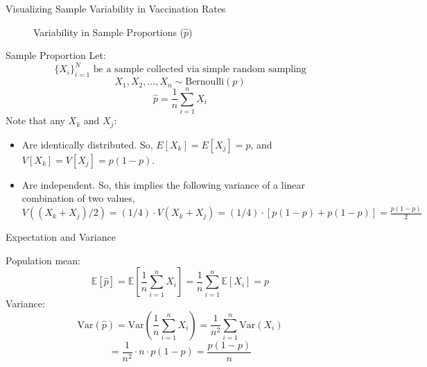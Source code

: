 \documentclass[handout]{beamer} %
\begin{document}
\begin{frame}{Visualizing Sample Variability in Vaccination Rates}
    \begin{figure}
        \centering
        \caption{Variability in Sample Proportions (\( \hat{p} \))}
    \end{figure}
\end{frame}

\begin{frame}{Sample Proportion}
Let:
\[ \{ X_i\}_{i=1}^{N} \text{ be a sample collected via simple random sampling}\]
\[
X_1, X_2, \dots, X_n \sim \text{Bernoulli}(p)
\]
\[
\hat{p} = \frac{1}{n} \sum_{i=1}^n X_i
\]
Note that any $X_k$ and $X_j$:
\begin{itemize}
    \item Are identically distributed. So, $E[X_k]=E[X_j]=p$, and $V[X_k]=V[X_j]=p(1-p)$.
    \item Are independent. So, this implies the following variance of a linear combination of two values, $V((X_k + X_j)/2) = (1/4)\cdot V(X_k+X_j) = (1/4)\cdot [p(1-p) + p(1-p)] = \frac{p(1-p)}{2}$

\end{itemize}
\end{frame}

\begin{frame}{Expectation and Variance}

Population mean:
\[
\mathbb{E}[\hat{p}]
= \mathbb{E}\left[\frac{1}{n} \sum_{i=1}^n X_i\right]
= \frac{1}{n} \sum_{i=1}^n \mathbb{E}[X_i]
= p
\]
Variance:
\[
\text{Var}(\hat{p})
= \text{Var}\left(\frac{1}{n} \sum_{i=1}^n X_i\right)
= \frac{1}{n^2} \sum_{i=1}^n \text{Var}(X_i)
\]
\[
= \frac{1}{n^2} \cdot n \cdot p(1 - p)
= \frac{p(1 - p)}{n}
\]
\end{frame}
\end{document}
